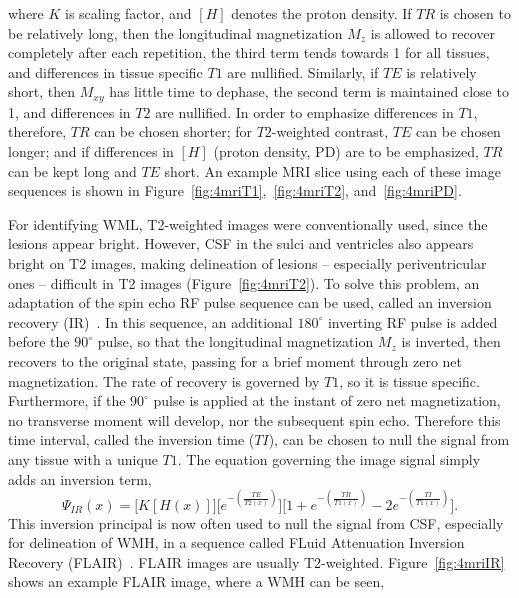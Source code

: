 where $K$ is scaling factor, and $\left[H\right]$ denotes the proton density.
If $TR$ is chosen to be relatively long, 
then the longitudinal magnetization $M_z$ is allowed to recover completely after each repetition,
the third term tends towards 1 for all tissues,
and differences in tissue specific $T1$ are nullified.
Similarly, if $TE$ is relatively short,
then $M_{xy}$ has little time to dephase,
the second term is maintained close to 1,
and differences in $T2$ are nullified.
In order to emphasize differences in $T1$, therefore, $TR$ can be chosen shorter;
for $T2$-weighted contrast, $TE$ can be chosen longer;
and if differences in $[H]$ (proton density, PD) are to be emphasized,
$TR$ can be kept long and $TE$ short.
An example MRI slice using each of these image sequences
is shown in Figure~\ref{fig:4mriT1},~\ref{fig:4mriT2}, and~\ref{fig:4mriPD}.
\par
For identifying WML, T2-weighted images were conventionally used, since the lesions appear bright.
However, CSF in the sulci and ventricles also appears bright on T2 images,
making delineation of lesions -- especially periventricular ones --
difficult in T2 images (Figure~\ref{fig:4mriT2}).
To solve this problem, an adaptation of the spin echo RF pulse sequence can be used,
called an inversion recovery (IR)~\cite{Bydder1985}.
In this sequence, an additional $180^{\circ}$ inverting RF pulse is added before the
$90^{\circ}$ pulse, so that the longitudinal magnetization $M_z$ is inverted,
then recovers to the original state, passing for a brief moment through zero net magnetization.
The rate of recovery is governed by $T1$, so it is tissue specific.
Furthermore, if the $90^{\circ}$ pulse is applied at the instant of zero net magnetization,
no transverse moment will develop, nor the subsequent spin echo.
Therefore this time interval, called the inversion time ($TI$), 
can be chosen to null the signal from any tissue with a unique $T1$.
The equation governing the image signal simply adds an inversion term,
\begin{equation}\label{eq:MRI-IR}
  \Psi_{IR}(x) = \bigg[K \left[H(x)\right]\bigg]
    \bigg[e^{-\left(\frac{TE}{T2(x)}\right)}\bigg]
    \bigg[1 + e^{-\left(\frac{TR}{T1(x)}\right)} - 2e^{-\left(\frac{TI}{T1(x)}\right)}\bigg].
\end{equation}
This inversion principal is now often used to null the signal from CSF,
especially for delineation of WMH, in a sequence called
FLuid Attenuation Inversion Recovery (FLAIR)~\cite{Hajnal1992}.
FLAIR images are usually T2-weighted.
Figure~\ref{fig:4mriIR} shows an example FLAIR image, where a WMH can be seen,
